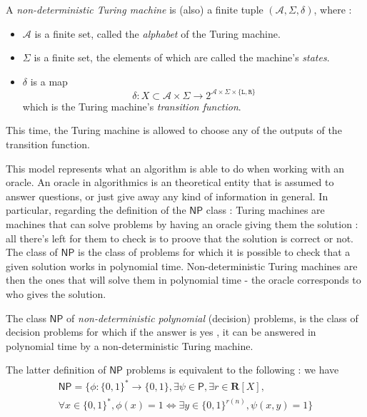 \begin{definition}
    A \textit{non-deterministic Turing machine} is (also) a finite tuple \( (\mathcal A, \Sigma, \delta) \), where :
    \begin{itemize}
        \item $ \mathcal A $ is a finite set, called the \textit{alphabet} of the Turing machine.
        \item $ \Sigma $ is a finite set, the elements of which are called the machine's \textit{states}.
        \item $ \delta $ is a map
        \[
        \delta : X \subset \mathcal A \times \Sigma \to 2^{\mathcal A \times \Sigma \times \{ \texttt{L}, \texttt{R}\} }
        \]
        which is the Turing machine's \textit{transition function}.
    \end{itemize}
\end{definition}

This time, the Turing machine is allowed to \og choose \fg any of the outputs of the transition function.

This model represents what an algorithm is able to do when working with an oracle. An oracle in algorithmics is an theoretical entity that is assumed to answer questions, or just give away any kind of information in general. In particular, regarding the definition of the $ \mathsf{NP} $ class : Turing machines are machines that can solve problems by having an oracle giving them the solution : all there's left for them to check is to proove that the solution is correct or not. The class of $ \mathsf{NP} $ is the class of problems for which it is possible to check that a given solution works in polynomial time. Non-deterministic Turing machines are then the ones that will \og solve \fg them in polynomial time - the oracle corresponds to who gives the solution.

\begin{definition}[$ \mathsf{NP} $]
    The class $ \mathsf{NP} $ of \textit{non-deterministic polynomial} (decision) problems, is the class of decision problems for which if the answer is \og yes \fg, it can be answered in polynomial time by a non-deterministic Turing machine.
\end{definition}

\begin{proposition}
    The latter definition of $ \mathsf{NP} $ problems is equivalent to the following : we have
    \begin{multline*}
        \mathsf{NP} = \{ \phi : \{ 0,1 \}^* \to \{ 0,1 \}, \exists \psi \in \mathsf P, \exists r \in \mathbf R[X], \\
         \forall x \in \{ 0,1 \}^*, \phi(x) = 1 \iff \exists y \in \{ 0,1 \}^{r(n)}, \psi(x,y) = 1 \}
    \end{multline*}
\end{proposition}

